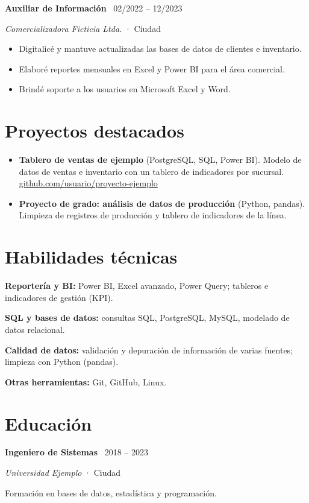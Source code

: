 \documentclass[10pt,a4paper]{article}
\newcommand{\cargo}[4]{%
  \par\noindent\textbf{#1} \textbar\ #4\par
  \noindent\textit{#2} · #3\par}
\begin{document}
\cargo{Auxiliar de Información}{Comercializadora Ficticia Ltda.}{Ciudad}{02/2022 -- 12/2023}
\begin{itemize}
  \item Digitalicé y mantuve actualizadas las bases de datos de clientes e inventario.
  \item Elaboré reportes mensuales en Excel y Power BI para el área comercial.
  \item Brindé soporte a los usuarios en Microsoft Excel y Word.
\end{itemize}

\section{Proyectos destacados}
\begin{itemize}\raggedright
  \item \textbf{Tablero de ventas de ejemplo} (PostgreSQL, SQL, Power BI). Modelo de datos de ventas e inventario con un tablero de indicadores por sucursal. \href{https://github.com/usuario/proyecto-ejemplo}{github.com/usuario/proyecto-ejemplo}
  \item \textbf{Proyecto de grado: análisis de datos de producción} (Python, pandas). Limpieza de registros de producción y tablero de indicadores de la línea.
\end{itemize}

\section{Habilidades técnicas}
\textbf{Reportería y BI:} Power BI, Excel avanzado, Power Query; tableros e indicadores de gestión (KPI).\par
\textbf{SQL y bases de datos:} consultas SQL, PostgreSQL, MySQL, modelado de datos relacional.\par
\textbf{Calidad de datos:} validación y depuración de información de varias fuentes; limpieza con Python (pandas).\par
\textbf{Otras herramientas:} Git, GitHub, Linux.\par

\section{Educación}
\cargo{Ingeniero de Sistemas}{Universidad Ejemplo}{Ciudad}{2018 -- 2023}
Formación en bases de datos, estadística y programación.\par
\end{document}
